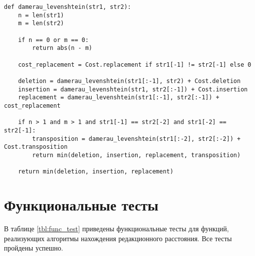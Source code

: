 \begin{center}
\captionsetup{justification=raggedright,singlelinecheck=off}
\begin{lstlisting}[label=lst:dl,caption=Рекурсивный алгоритм нахождения расстояния Дамерау-Левенштейна]
def damerau_levenshtein(str1, str2):
    n = len(str1)
    m = len(str2)

    if n == 0 or m == 0:
        return abs(n - m)

    cost_replacement = Cost.replacement if str1[-1] != str2[-1] else 0

    deletion = damerau_levenshtein(str1[:-1], str2) + Cost.deletion
    insertion = damerau_levenshtein(str1, str2[:-1]) + Cost.insertion
    replacement = damerau_levenshtein(str1[:-1], str2[:-1]) + cost_replacement

    if n > 1 and m > 1 and str1[-1] == str2[-2] and str1[-2] == str2[-1]:
        transposition = damerau_levenshtein(str1[:-2], str2[:-2]) + Cost.transposition
        return min(deletion, insertion, replacement, transposition)

    return min(deletion, insertion, replacement)
\end{lstlisting} 
\end{center}

\section{Функциональные тесты}

В таблице \ref{tbl:func_test} приведены функциональные тесты для функций, реализующих алгоритмы нахождения редакционного расстояния. Все тесты пройдены успешно.

